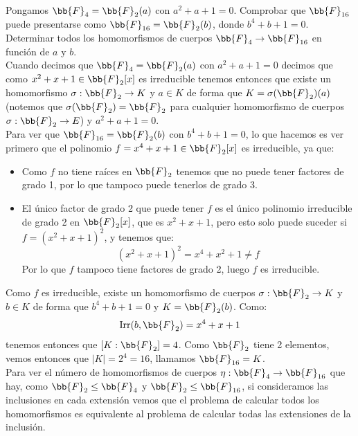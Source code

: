 \begin{ejercicio} %
    Pongamos $\bb{F}_4 = \bb{F}_2(a)$ con $a^2+a+1=0$. Comprobar que $\bb{F}_{16}$ puede presentarse como $\bb{F}_{16}=\bb{F}_2(b)$, donde $b^4+b+1=0$. Determinar todos los homomorfismos de cuerpos $\bb{F}_4\to \bb{F}_{16}$ en función de $a$ y $b$.\\

    \noindent
    Cuando decimos que $\bb{F}_4 = \bb{F}_2(a)$ con $a^2+a+1=0$ decimos que como $x^2+x+1\in \bb{F}_2[x]$ es irreducible tenemos entonces que existe un homomorfismo $\sigma:\bb{F}_2\to K$ y $a\in K$ de forma que $K = \sigma(\bb{F}_2)(a)$ (notemos que $\sigma(\bb{F}_2) = \bb{F}_2$ para cualquier homomorfismo de cuerpos $\sigma:\bb{F}_2\to E$) y $a^2+a+1 = 0$.\\

    \noindent
    Para ver que $\bb{F}_{16} = \bb{F}_2(b)$ con $b^4+b+1=0$, lo que hacemos es ver primero que el polinomio $f = x^4+x+1\in \bb{F}_2[x]$ es irreducible, ya que:
    \begin{itemize}
        \item Como $f$ no tiene raíces en $\bb{F}_2$ tenemos que no puede tener factores de grado 1, por lo que tampoco puede tenerlos de grado 3.
        \item El único factor de grado 2 que puede tener $f$ es el único polinomio irreducible de grado 2 en $\bb{F}_2[x]$, que es $x^2+x+1$, pero esto solo puede suceder si $f = {(x^2+x+1)}^{2}$, y tenemos que:
            \begin{equation*}
                {(x^2+x+1)}^{2} = x^4+x^2+1 \neq f
            \end{equation*}
            Por lo que $f$ tampoco tiene factores de grado 2, luego $f$ es irreducible.
    \end{itemize}
    Como $f$ es irreducible, existe un homomorfismo de cuerpos $\sigma:\bb{F}_2\to K$ y $b\in K$ de forma que $b^4+b+1=0$ y $K = \bb{F}_2(b)$. Como:
    \begin{equation*}
        \Irr(b,\bb{F}_2) = x^4+x+1
    \end{equation*}
    tenemos entonces que $[K:\bb{F}_2] = 4$. Como $\bb{F}_2$ tiene 2 elementos, vemos entonces que $|K| = 2^4 = 16$, llamamos $\bb{F}_{16} = K$.\\

    \noindent
    Para ver el número de homomorfismos de cuerpos $\eta:\bb{F}_4\to \bb{F}_{16}$ que hay, como $\bb{F}_2\leq \bb{F}_4$ y $\bb{F}_2\leq \bb{F}_{16}$, si consideramos las inclusiones en cada extensión vemos que el problema de calcular todos los homomorfismos es equivalente al problema de calcular todas las extensiones de la inclusión.


\end{ejercicio}
